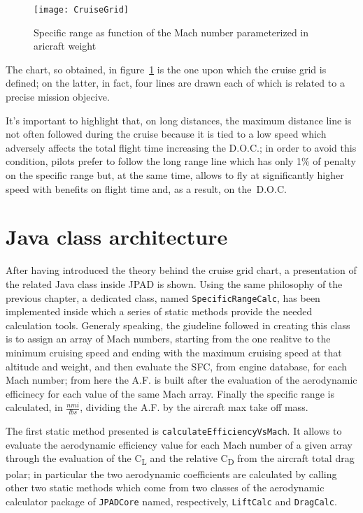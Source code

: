\begin{figure}[b]
\centering
\texttt{[image: CruiseGrid]}
\caption{Specific range as function of the Mach number parameterized in aricraft weight}
\label{fig:Figure6}
\end{figure}

\bigskip
\noindent
The chart, so obtained, in figure~\ref{fig:Figure6} is the one upon which the cruise grid is defined; on the latter, in fact, four lines are drawn each of which is related to a precise mission objecive.

It's important to highlight that, on long distances, the maximum distance line is not often followed during the cruise because it is tied to a low speed which adversely affects the total flight time increasing the D.O.C.; in order to avoid this condition, pilots prefer to follow the long range line which has only 1\% of penalty on the specific range but, at the same time, allows to fly at significantly higher speed with benefits on flight time and, as a result, on the~D.O.C.


\section{Java class architecture}
After having introduced the theory behind the cruise grid chart, a presentation of the related Java class inside JPAD is shown. Using the same philosophy of the previous chapter, a dedicated class, named \lstinline[language=Java]!SpecificRangeCalc!, has been implemented inside which a series of static methods provide the needed calculation tools. Generaly speaking, the giudeline followed in creating this class is to assign an array of Mach numbers, starting from the one realitve to the minimum cruising speed and ending with the maximum cruising speed at that altitude and weight, and then evaluate the SFC, from engine database, for each Mach number; from here the A.F. is built after the evaluation of the aerodynamic efficinecy for each value of the same Mach array. Finally the specific range is calculated, in $\frac{\si{nmi}}{\si{lbs}}$, dividing the A.F. by the aircraft max take off mass.

\bigskip
\noindent
The first static method presented is \lstinline[language=Java]!calculateEfficiencyVsMach!. It allows to evaluate the aerodynamic efficiency value for each  Mach number of a given array through the evaluation of the C\textsubscript{L} and the relative C\textsubscript{D} from the aircraft total drag polar; in particular the two aerodynamic coefficients are calculated by calling other two static methods which come from two classes of the aerodynamic calculator package of \lstinline[language=Java]!JPADCore! named, respectively, \lstinline[language=Java]!LiftCalc! and \lstinline[language=Java]!DragCalc!.

